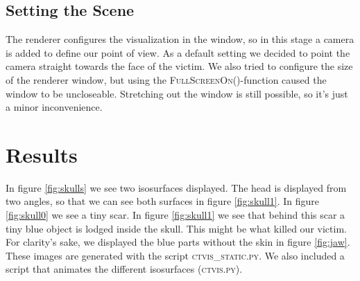 \documentclass{article}
\begin{document}
\subsection*{Setting the Scene}
The renderer configures the visualization in the window, so in this stage a camera is added to define our point of view. As a default setting we decided to point the camera straight towards the face of the victim. We also tried to configure the size of the renderer window, but using the \textsc{FullScreenOn()}-function caused the window to be uncloseable. Stretching out the window is still possible, so it's just a minor inconvenience.


\section{Results}

In figure \ref{fig:skulls} we see two isosurfaces displayed. The head is displayed
from two angles, so that we can see both surfaces in figure \ref{fig:skull1}.
In figure \ref{fig:skull0} we see a tiny scar.
In figure \ref{fig:skull1} we see that behind this scar a tiny blue object is
lodged inside the skull. This might be what killed our victim.
For clarity's sake, we displayed the blue parts without the skin in figure
\ref{fig:jaw}.
These images are generated with the script \textsc{ctvis\_static.py}. We also
included a script that animates the different isosurfaces (\textsc{ctvis.py}).
\end{document}
